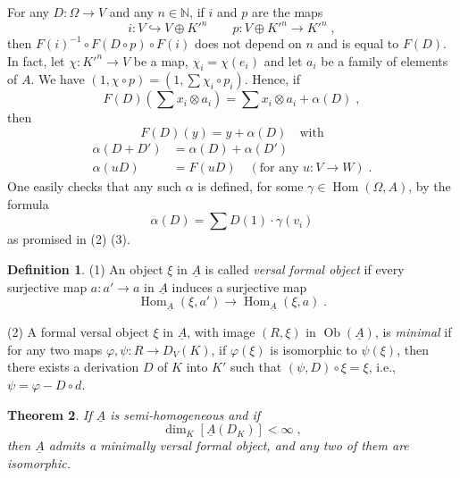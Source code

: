 \documentclass[11pt]{article}
\theoremstyle{plain}
\newtheorem{theorem}{Theorem}[section]
\theoremstyle{definition}
\newtheorem{definition}[theorem]{Definition}
\theoremstyle{remark}
\newcommand{\bN}{\mathbb N}
\DeclareMathOperator{\Hom}{Hom}
\DeclareMathOperator{\Ob}{Ob}
\newcommand{\uA}{\underline{A}}\newcommand{\uH}{\underline{H}}\newcommand{\uExt}{\underline{\operatorname{Ext}}}\newcommand{\uL}{\underline{L}}\newcommand{\uM}{\underline{M}}\newcommand{\uZ}{\underline{Z}}\newcommand{\uB}{\underline{B}}\newcommand{\uC}{\underline{C}}\newcommand{\uD}{\underline{D}}\newcommand{\uE}{\underline{E}}\newcommand{\uG}{\underline{G}}\newcommand{\uP}{\underline{P}}\newcommand{\uQ}{\underline{Q}}
\begin{document}
For any $D : \Omega \to V$ and any $n \in \bN$, if $i$ and $p$ are the maps
\[
i : V \hookrightarrow V \oplus K'^n \qquad p : V \oplus K'^n \longrightarrow K'^n\;,
\]
then $F(i)^{-1} \circ F(D \circ p) \circ F(i)$ does not depend on $n$ and is equal to $F(D)$. In fact, let $\chi : K'^n \to V$ be a map, $\chi_i = \chi(e_i)$ and let $a_i$ be a family of elements of $A$. We have $(1, \chi \circ p) = (1, \sum \chi_i \circ p_i)$. Hence, if
\[
F(D)\left(\sum x_i \otimes a_i\right) = \sum x_i \otimes a_i + \alpha(D)\;,
\]
then
\[
F(D)(y) = y + \alpha(D) \quad \text{with}
\]
\begin{align*}
\alpha(D + D') &= \alpha(D) + \alpha(D') \\
\alpha(uD) &= F(uD)\quad (\text{for any } u : V \to W)\;.
\end{align*}
One easily checks that any such $\alpha$ is defined, for some $\gamma \in \Hom(\Omega, A)$, by the formula
\[
\alpha(D) = \sum D(1) \cdot \gamma(v_i)
\]
as promised in (2) (3).

\begin{definition}
\textup{(1)} An object $\xi$ in $\uA$ is called \emph{versal formal object} if every surjective map $a : a' \to a$ in $\uA$ induces a surjective map
\[
\Hom_{\uA}(\xi, a') \longrightarrow \Hom_{\uA}(\xi, a)\;.
\]

\textup{(2)} A formal versal object $\xi$ in $\uA$, with image $(R, \xi)$ in $\Ob(\uA)$, is \emph{minimal} if for any two maps $\varphi, \psi : R \to D_V(K)$, if $\varphi(\xi)$ is isomorphic to $\psi(\xi)$, then there exists a derivation $D$ of $K$ into $K'$ such that $(\psi, D) \circ \xi = \xi$, i.e., $\psi = \varphi - D \circ d$.
\end{definition}

\begin{theorem}
If $\uA$ is semi-homogeneous and if
\[
\dim_K [\uA(D_K)] < \infty\;,
\]
then $\uA$ admits a minimally versal formal object, and any two of them are isomorphic.
\end{theorem}
\end{document}
